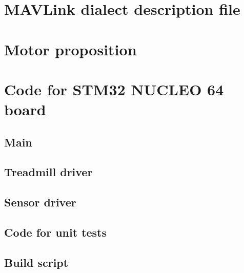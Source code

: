 \documentclass[12pt,a4paper, twoside]{article}
\begin{document}
\section{MAVLink dialect description file}\label{app:mavlink}

\section{Motor proposition}\label{app:motor}

\section{Code for STM32 NUCLEO 64 board}
\subsection{Main}


\subsection{Treadmill driver}


\subsection{Sensor driver}


\subsection{Code for unit tests}








\subsection{Build script}

\end{document}
